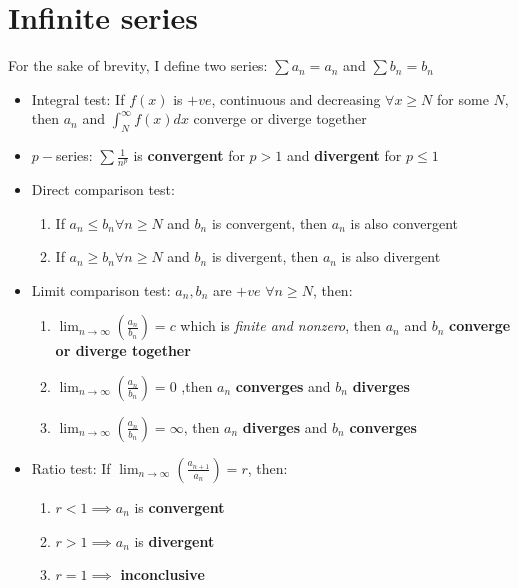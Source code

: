 \documentclass[a4paper]{article}
\begin{document}
\section{Infinite series}
For the sake of brevity, I define two series: $\sum a_n=a_n$ and $\sum b_n=b_n$
\begin{itemize}
    \item Integral test: If $f(x)$ is $+ve$, continuous and decreasing $\forall x\geq N$ for some $N$, then $a_n$ and $\int_{N}^{\infty}f(x)dx$ converge or diverge together

    \item $p-$series: $\sum \frac{1}{n^p}$ is \textbf{convergent} for $p>1$ and \textbf{divergent} for $p\leq 1$ 
    \item Direct comparison test:
        \begin{enumerate}
            \item If $a_n\leq b_n \forall n\geq N$ and $b_n$ is convergent, then $a_n$ is also convergent
            \item If $a_n\geq b_n \forall n\geq N$ and $b_n$ is divergent, then $a_n$ is also divergent
        \end{enumerate}
        
    \item Limit comparison test: $a_n,b_n$ are $+ve$ $\forall n\geq N$, then:
    \begin{enumerate}
        \item $\displaystyle\lim_{n\to\infty}\left(\frac{a_n}{b_n}\right)=c$ which is \textit{finite and nonzero}, then $a_n$ and $b_n$ \textbf{converge or diverge together}
        \item  $\displaystyle\lim_{n\to\infty}\left(\frac{a_n}{b_n}\right)=0$ ,then $a_n$ \textbf{converges} and $b_n$ \textbf{diverges}
        \item $\displaystyle\lim_{n\to\infty}\left(\frac{a_n}{b_n}\right)=\infty$, then $a_n$ \textbf{diverges} and $b_n$ \textbf{converges}
    \end{enumerate}
    
    \item Ratio test: If $\displaystyle\lim_{n\to\infty}\left(\frac{a_{n+1}}{a_n}\right)=r$, then:
    \begin{enumerate}
        \item $r<1 \implies a_n$ is \textbf{convergent}
        \item $r>1 \implies a_n$ is \textbf{divergent}
        \item $r=1 \implies$ \textbf{inconclusive}
    \end{enumerate}
    

\end{itemize}
\end{document}
